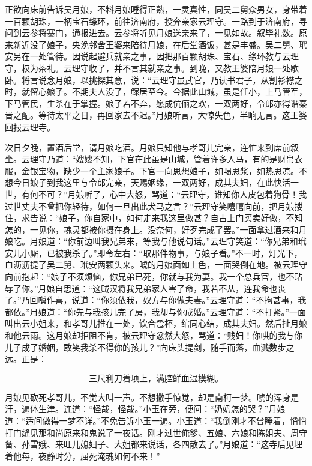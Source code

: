 正欲向床前告诉吴月娘，不料月娘睡得正熟，一灵真性，同吴二舅众男女，身带着一百颗胡珠，一柄宝石绦环，前往济南府，投奔亲家云理守。一路到于济南府，寻问到云参将寨门，通报进去。云参将听见月娘送亲来了，一见如故。叙毕礼数。原来新近没了娘子，央浼邻舍王婆来陪待月娘，在后堂酒饭，甚是丰盛。吴二舅、玳安另在一处管待。因说起避兵就亲之事，因把那百颗胡珠、宝石、绦环教与云理守，权为茶礼。云理守收了，并不言其就亲之事。到晚，又教王婆陪月娘一处歇卧。将言说念月娘，以挑探其意，说：“云理守虽武官，乃读书君子，从割衫襟之时，就留心娘子。不期夫人没了，鳏居至今。今据此山城，虽是任小，上马管军，下马管民，生杀在于掌握。娘子若不弃，愿成伉俪之欢，一双两好，令郎亦得谐秦晋之配。等待太平之日，再回家去不迟。”月娘听言，大惊失色，半晌无言。这王婆回报云理寺。

次日夕晚，置酒后堂，请月娘吃酒。月娘只知他与孝哥儿完亲，连忙来到席前叙坐。云理守乃道：“嫂嫂不知，下官在此虽是山城，管着许多人马，有的是财帛衣服，金银宝物，缺少一个主家娘子。下官一向思想娘子，如喝思浆，如热思凉。不想今日娘子到我这里与令郎完亲，天赐姻缘，一双两好，成其夫妇，在此快活一世，有何不可？”月娘听了，心中大怒，骂道：“云理守，谁知你人皮包着狗骨！我过世丈夫不曾把你轻待，如何一旦出此犬马之言？”云理守笑嘻嘻向前，把月娘搂住，求告说：“娘子，你自家中，如何走来我这里做甚？自古上门买卖好做，不知怎的，一见你，魂灵都被你摄在身上。没奈何，好歹完成了罢。”一面拿过酒来和月娘吃。月娘道：“你前边叫我兄弟来，等我与他说句话。”云理守笑道：“你兄弟和玳安儿小厮，已被我杀了。”即令左右：“取那件物事，与娘子看。”不一时，灯光下，血沥沥提了吴二舅、玳安两颗头来。唬的月娘面如土色，一面哭倒在地。被云理守向前抱起：“娘子不须烦恼，你兄弟已死，你就与我为妻。我一个总兵官，也不玷辱了你。”月娘自思道：“这贼汉将我兄弟家人害了命，我若不从，连我命也丧了。”乃回嗔作喜，说道：“你须依我，奴方与你做夫妻。”云理守道：“不拘甚事，我都依。”月娘道：“你先与我孩儿完了房，我却与你成婚。”云理守道：“不打紧。”一面叫出云小姐来，和孝哥儿推在一处，饮合卺杯，绾同心结，成其夫妇。然后扯月娘和他云雨。这月娘却拒阻不肯，被云理守忿然大怒，骂道：“贱妇！你哄的我与你儿子成了婚姻，敢笑我杀不得你的孩儿？”向床头提剑，随手而落，血溅数步之远。正是：

\[
三尺利刀着项上，满腔鲜血湿模糊。
\]

月娘见砍死孝哥儿，不觉大叫一声。不想撒手惊觉，却是南柯一梦。唬的浑身是汗，遍体生津。连道：“怪哉，怪哉。”小玉在旁，便问：“奶奶怎的哭？”月娘道：“适间做得一梦不详。”不免告诉小玉一遍。小玉道：“我倒刚才不曾睡着，悄悄打门缝见那和尚原来和鬼说了一夜话。刚才过世俺爹、五娘、六娘和陈姐夫、周守备、孙雪娥、来旺儿媳妇子、大姐都来说话，各四散去了。”月娘道：“这寺后见埋着他每，夜静时分，屈死淹魂如何不来！”

